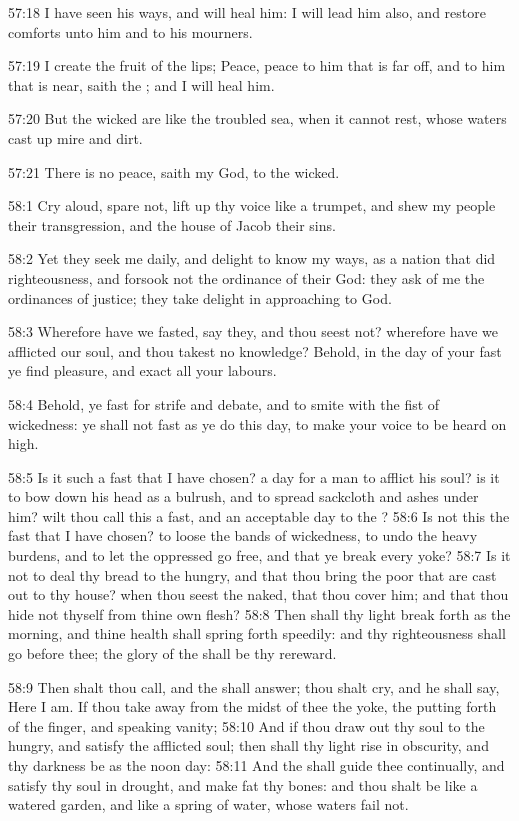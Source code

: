 57:18 I have seen his ways, and will heal him: I will lead him also,
and restore comforts unto him and to his mourners.

57:19 I create the fruit of the lips; Peace, peace to him that is far
off, and to him that is near, saith the \LORD; and I will heal him.

57:20 But the wicked are like the troubled sea, when it cannot rest,
whose waters cast up mire and dirt.

57:21 There is no peace, saith my God, to the wicked.

58:1 Cry aloud, spare not, lift up thy voice like a trumpet, and shew
my people their transgression, and the house of Jacob their sins.

58:2 Yet they seek me daily, and delight to know my ways, as a nation
that did righteousness, and forsook not the ordinance of their God:
they ask of me the ordinances of justice; they take delight in
approaching to God.

58:3 Wherefore have we fasted, say they, and thou seest not? wherefore
have we afflicted our soul, and thou takest no knowledge? Behold, in
the day of your fast ye find pleasure, and exact all your labours.

58:4 Behold, ye fast for strife and debate, and to smite with the fist
of wickedness: ye shall not fast as ye do this day, to make your voice
to be heard on high.

58:5 Is it such a fast that I have chosen? a day for a man to afflict
his soul? is it to bow down his head as a bulrush, and to spread
sackcloth and ashes under him? wilt thou call this a fast, and an
acceptable day to the \LORD?  58:6 Is not this the fast that I have
chosen? to loose the bands of wickedness, to undo the heavy burdens,
and to let the oppressed go free, and that ye break every yoke?  58:7
Is it not to deal thy bread to the hungry, and that thou bring the
poor that are cast out to thy house? when thou seest the naked, that
thou cover him; and that thou hide not thyself from thine own flesh?
58:8 Then shall thy light break forth as the morning, and thine health
shall spring forth speedily: and thy righteousness shall go before
thee; the glory of the \LORD shall be thy rereward.

58:9 Then shalt thou call, and the \LORD shall answer; thou shalt cry,
and he shall say, Here I am. If thou take away from the midst of thee
the yoke, the putting forth of the finger, and speaking vanity; 58:10
And if thou draw out thy soul to the hungry, and satisfy the afflicted
soul; then shall thy light rise in obscurity, and thy darkness be as
the noon day: 58:11 And the \LORD shall guide thee continually, and
satisfy thy soul in drought, and make fat thy bones: and thou shalt be
like a watered garden, and like a spring of water, whose waters fail
not.

